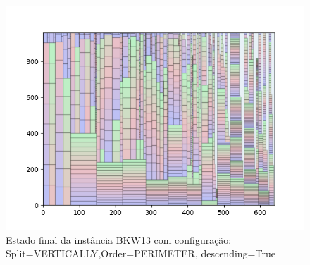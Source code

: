 \begin{figure}[H]
    \centering
    \caption[]{Estado final da instância BKW13 com configuração: Split=VERTICALLY,Order=PERIMETER, descending=True}
    \label{fig:bkw13-vertically-perimeter-true}
    \includegraphics[scale=0.5]{output/figures/bkw/bkw13/vertically/perimeter/true/0000}
\end{figure}